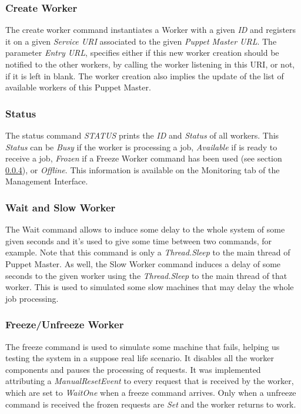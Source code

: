 \documentclass[times, 10pt,twocolumn]{article}
\begin{document}
            \subsubsection{Create Worker}
            
            The create worker command instantiates a Worker with a given \emph{ID} and registers it on a given \emph{Service URI} associated to the given \emph{Puppet Master URL}. The parameter \emph{Entry URL}, specifies either if this new worker creation should be notified to the other workers, by calling the worker listening in this URI, or not, if it is left in blank. The worker creation also implies the update of the list of available workers of this Puppet Master.
            
            \subsubsection{Status}

            The status command \emph{STATUS} prints the \emph{ID} and \emph{Status} of all workers. This \emph{Status} can be  \emph{Busy} if the worker is processing a job, \emph{Available} if is ready to receive a job, \emph{Frozen} if a Freeze Worker command has been used (see section \ref{freeze}), or \emph{Offline}. This information is available on the Monitoring tab of the Management Interface.

            \subsubsection{Wait and Slow Worker}
            
            The Wait command allows to induce some delay to the whole system of some given seconds and it's used to give some time between two commands, for example. Note that this command is only a \emph{Thread.Sleep} to the main thread of Puppet Master. As well, the Slow Worker command induces a delay of some seconds to the given worker using the \emph{Thread.Sleep} to the main thread of that worker. This is used to simulated some slow machines that may delay the whole job processing.

            \subsubsection{Freeze/Unfreeze Worker} \label{freeze}
            
            The freeze command is used to simulate some machine that fails, helping us testing the system in a suppose real life scenario. It disables all the worker components and pauses the processing of requests. It was implemented attributing a \emph{ManualResetEvent} to every request that is received by the worker, which are set to \emph{WaitOne} when a freeze command arrives. Only when a unfreeze command is received the frozen requests are \emph{Set} and the worker returns to work.
\end{document}
